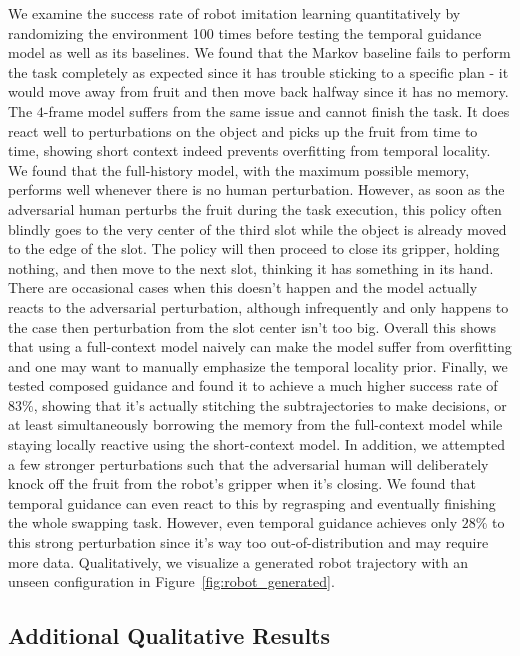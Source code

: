 We examine the success rate of robot imitation learning quantitatively by randomizing the environment 100 times before testing the temporal guidance model as well as its baselines. We found that the Markov baseline fails to perform the task completely as expected since it has trouble sticking to a specific plan - it would move away from fruit and then move back halfway since it has no memory. The $4$-frame model suffers from the same issue and cannot finish the task. It does react well to perturbations on the object and picks up the fruit from time to time, showing short context indeed prevents overfitting from temporal locality. We found that the full-history model, with the maximum possible memory, performs well whenever there is no human perturbation. However, as soon as the adversarial human perturbs the fruit during the task execution, this policy often blindly goes to the very center of the third slot while the object is already moved to the edge of the slot. The policy will then proceed to close its gripper, holding nothing, and then move to the next slot, thinking it has something in its hand. There are occasional cases when this doesn't happen and the model actually reacts to the adversarial perturbation, although infrequently and only happens to the case then perturbation from the slot center isn't too big. Overall this shows that using a full-context model naively can make the model suffer from overfitting and one may want to manually emphasize the temporal locality prior. Finally, we tested \mtd composed guidance and found it to achieve a much higher success rate of $83\%$, showing that it's actually stitching the subtrajectories to make decisions, or at least simultaneously borrowing the memory from the full-context model while staying locally reactive using the short-context model. In addition, we attempted a few stronger perturbations such that the adversarial human will deliberately knock off the fruit from the robot's gripper when it's closing. We found that temporal guidance can even react to this by regrasping and eventually finishing the whole swapping task. However, even temporal guidance achieves only $28\%$ to this strong perturbation since it's way too out-of-distribution and may require more data. Qualitatively, we visualize a generated robot trajectory with an unseen configuration in Figure~\ref{fig:robot_generated}. 

\subsection{Additional Qualitative Results}
\label{app:exp_results_additional}

